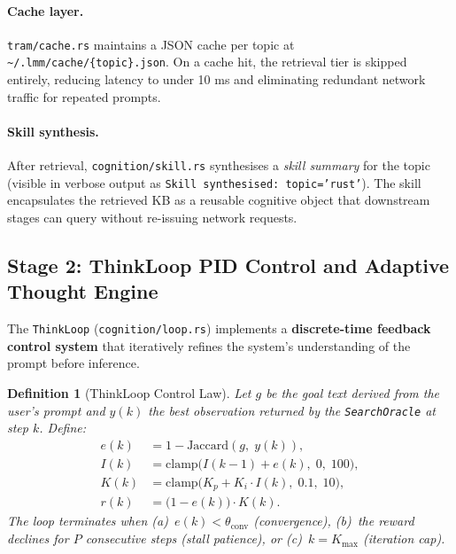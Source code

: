 \documentclass[11pt,a4paper]{article}
\newtheorem{definition}{Definition}[section]
\begin{document}
\paragraph{Cache layer.}
\texttt{tram/cache.rs} maintains a JSON cache per topic at \texttt{\textasciitilde/.lmm/cache/\{topic\}.json}.
On a cache hit, the retrieval tier is skipped entirely, reducing latency to under 10 ms and
eliminating redundant network traffic for repeated prompts.

\paragraph{Skill synthesis.}
After retrieval, \texttt{cognition/skill.rs} synthesises a \emph{skill summary} for the topic
(visible in verbose output as \texttt{Skill synthesised: topic='rust'}). The skill encapsulates
the retrieved KB as a reusable cognitive object that downstream stages can query without
re-issuing network requests.

\subsection{Stage 2: ThinkLoop PID Control and Adaptive Thought Engine}
\label{sec:thinkloop}

The \texttt{ThinkLoop} (\texttt{cognition/loop.rs}) implements a \textbf{discrete-time feedback
control system} that iteratively refines the system's understanding of the prompt before inference.

\begin{definition}[ThinkLoop Control Law]
Let $g$ be the goal text derived from the user's prompt and $y(k)$ the best observation returned
by the \texttt{SearchOracle} at step $k$. Define:
\begin{align}
  e(k)   &= 1 - \mathrm{Jaccard}(g,\; y(k)), \label{eq:error}\\
  I(k)   &= \mathrm{clamp}\!\bigl(I(k-1) + e(k),\; 0,\; 100\bigr), \label{eq:integral}\\
  K(k)   &= \mathrm{clamp}\!\bigl(K_p + K_i \cdot I(k),\; 0.1,\; 10\bigr), \label{eq:gain}\\
  r(k)   &= \bigl(1 - e(k)\bigr) \cdot K(k). \label{eq:reward}
\end{align}
The loop terminates when (a)~$e(k) < \theta_{\mathrm{conv}}$ (convergence), (b)~the reward
declines for $P$ consecutive steps (stall patience), or (c)~$k = K_{\max}$ (iteration cap).
\end{definition}
\end{document}
